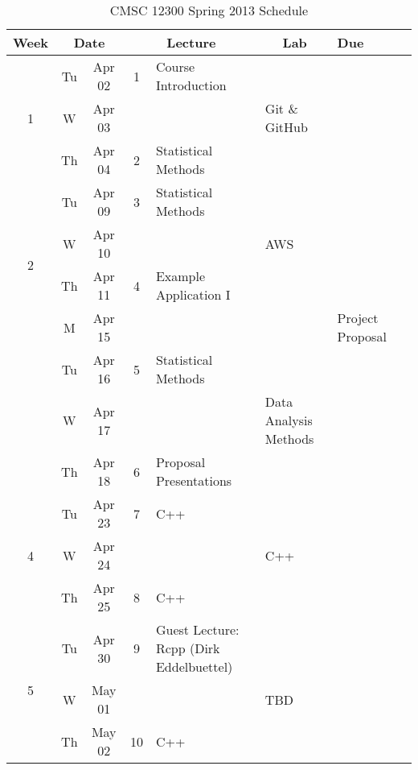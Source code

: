 \documentclass[11pt]{article}
\newcommand{\emptycell}{\cellcolor[gray]{0.9}}
\begin{document}
\begin{landscape}
\sffamily
\setlength{\extrarowheight}{4pt}
\begin{longtable}{|c|cc|c|p{7cm}|p{6cm}|p{2cm}|c|}
\caption{CMSC 12300 Spring 2013 Schedule}\label{tab:calendar}\\
\hline
\textbf{Week} & \multicolumn{2}{c|}{\textbf{Date}} & \multicolumn{ 2}{c|}{\textbf{Lecture}} & \multicolumn{1}{c|}{\textbf{Lab}} & \textbf{Due} \\ \hline
\multirow{3}{*}{1} 	& Tu & Apr 02 	& 1 		& Course Introduction 		& \emptycell  	& \emptycell \\ \cline{ 2- 8}
			& W & Apr 03	& \emptycell 	& \emptycell			& Git \& GitHub	& \emptycell \\ \cline{ 2- 8}
			& Th & Apr 04 	& 2 		& Statistical Methods      	& \emptycell  	& \emptycell \\ \hline\hline

\multirow{4}{*}{2} 	& Tu & Apr 09 	& 3 		& Statistical Methods      	& \emptycell  	& \emptycell \\ \cline{ 2- 8}
			& W & Apr 10	& \emptycell 	& \emptycell			& AWS	 	& \emptycell \\ \cline{ 2- 8}
			& Th & Apr 11 	& 4 		& Example Application I    	& \emptycell  	& \emptycell \\ \hline\hline

\multirow{3}{*}{3} 	& M & Apr 15 	& \emptycell	& \emptycell 			& \emptycell  	& Project \mbox{Proposal} \\ \cline{ 2- 8}			
			& Tu & Apr 16 	& 5 		& Statistical Methods   	& \emptycell  	& \emptycell \\ \cline{ 2- 8}
			& W & Apr 17	& \emptycell 	& \emptycell			& Data Analysis Methods	 	& \emptycell \\ \cline{ 2- 8}
			& Th & Apr 18 	& 6 		& Proposal Presentations	& \emptycell  	& \emptycell \\ \hline\hline

\multirow{3}{*}{4} 	& Tu & Apr 23 	& 7 		& C++				& \emptycell  	& \emptycell \\ \cline{ 2- 8}
			& W & Apr 24	& \emptycell 	& \emptycell			& C++	 	& \emptycell \\ \cline{ 2- 8}
			& Th & Apr 25 	& 8 		& C++			 	& \emptycell  	& \emptycell \\ \hline\hline

\multirow{3}{*}{5} 	& Tu & Apr 30 	& 9 		& Guest Lecture: Rcpp (Dirk Eddelbuettel)		& \emptycell  	& \emptycell \\ \cline{ 2- 8}
			& W & May 01	& \emptycell 	& \emptycell			& TBD	 	& \emptycell \\ \cline{ 2- 8}
			& Th & May 02 	& 10 		& C++	 	& \emptycell  	& \emptycell \\ \hline\hline


\end{longtable}
\end{landscape}
\end{document}
